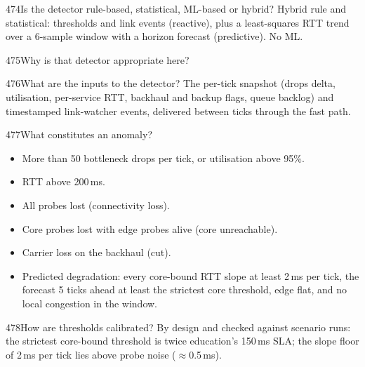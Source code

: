 \begin{qa}{474}{Is the detector rule-based, statistical, ML-based or hybrid?}
Hybrid rule and statistical: thresholds and link events (reactive), plus a least-squares RTT trend over a 6-sample
window with a horizon forecast (predictive). No ML.
\end{qa}

\begin{qa}{475}{Why is that detector appropriate here?}
\end{qa}

\begin{qa}{476}{What are the inputs to the detector?}
The per-tick snapshot (drops delta, utilisation, per-service RTT, backhaul and backup flags, queue backlog) and
timestamped link-watcher events, delivered between ticks through the fast path.
\end{qa}

\begin{qa}{477}{What constitutes an anomaly?}
\begin{itemize}
\item More than 50 bottleneck drops per tick, or utilisation above 95\%.
\item RTT above 200\,ms.
\item All probes lost (connectivity loss).
\item Core probes lost with edge probes alive (core unreachable).
\item Carrier loss on the backhaul (cut).
\item Predicted degradation: every core-bound RTT slope at least 2\,ms per tick, the forecast 5 ticks ahead at least
the strictest core threshold, edge flat, and no local congestion in the window.
\end{itemize}
\end{qa}

\begin{qa}{478}{How are thresholds calibrated?}
By design and checked against scenario runs: the strictest core-bound threshold is twice education's 150\,ms SLA;
the slope floor of 2\,ms per tick lies above probe noise ($\approx$0.5\,ms).
\end{qa}

